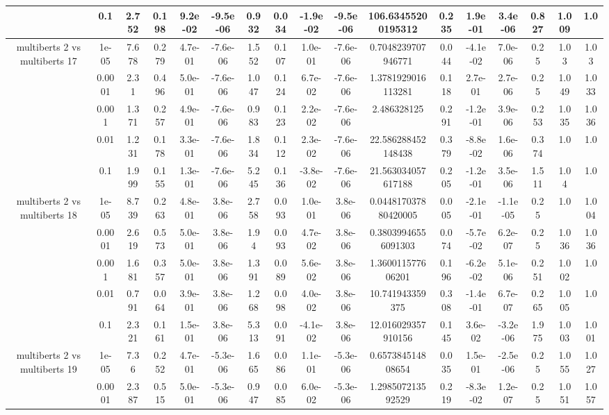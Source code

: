 \begin{tabular}{|c|c|c|c|c|c|c|c|c|c|c|c|c|c|c|c|c|}
 & 0.1 & 2.752 & 0.198 & 9.2e-02 & -9.5e-06 & 0.932 & 0.034 & -1.9e-02 & -9.5e-06 & 106.63455200195312 & 0.235 & 1.9e-01 & 3.4e-06 & 0.827 & 1.009 & 1.0 \\
\hline
\multirow{5}{*}{multiberts 2 vs multiberts 17} & 1e-05 & 7.678 & 0.279 & 4.7e-01 & -7.6e-06 & 1.552 & 0.107 & 1.0e-01 & -7.6e-06 & 0.7048239707946771 & 0.044 & -4.1e-02 & 7.0e-06 & 0.25 & 1.03 & 1.03 \\
 & 0.0001 & 2.31 & 0.496 & 5.0e-01 & -7.6e-06 & 1.047 & 0.124 & 6.7e-02 & -7.6e-06 & 1.3781929016113281 & 0.118 & 2.7e-01 & 2.7e-06 & 0.25 & 1.049 & 1.033 \\
 & 0.001 & 1.371 & 0.257 & 4.9e-01 & -7.6e-06 & 0.983 & 0.123 & 2.2e-02 & -7.6e-06 & 2.486328125 & 0.291 & -1.2e-01 & 3.9e-06 & 0.253 & 1.035 & 1.036 \\
 & 0.01 & 1.231 & 0.178 & 3.3e-01 & -7.6e-06 & 1.834 & 0.112 & 2.3e-02 & -7.6e-06 & 22.586288452148438 & 0.379 & -8.8e-02 & 1.6e-06 & 0.374 & 1.0 & 1.0 \\
 & 0.1 & 1.999 & 0.155 & 1.3e-01 & -7.6e-06 & 5.245 & 0.136 & -3.8e-02 & -7.6e-06 & 21.563034057617188 & 0.205 & -1.2e-01 & 3.5e-06 & 1.511 & 1.04 & 1.0 \\
\hline
\multirow{5}{*}{multiberts 2 vs multiberts 18} & 1e-05 & 8.739 & 0.263 & 4.8e-01 & 3.8e-06 & 2.758 & 0.093 & 1.0e-01 & 3.8e-06 & 0.044817037880420005 & 0.005 & -2.1e-01 & -1.1e-05 & 0.25 & 1.0 & 1.004 \\
 & 0.0001 & 2.619 & 0.573 & 5.0e-01 & 3.8e-06 & 1.94 & 0.093 & 4.7e-02 & 3.8e-06 & 0.38039946556091303 & 0.074 & -5.7e-02 & 6.2e-07 & 0.25 & 1.036 & 1.036 \\
 & 0.001 & 1.681 & 0.357 & 5.0e-01 & 3.8e-06 & 1.391 & 0.089 & 5.6e-02 & 3.8e-06 & 1.360011577606201 & 0.196 & -6.2e-02 & 5.1e-06 & 0.251 & 1.002 & 1.0 \\
 & 0.01 & 0.791 & 0.064 & 3.9e-01 & 3.8e-06 & 1.268 & 0.098 & 4.0e-02 & 3.8e-06 & 10.741943359375 & 0.308 & -1.4e-01 & 6.7e-07 & 0.265 & 1.005 & 1.0 \\
 & 0.1 & 2.321 & 0.161 & 1.5e-01 & 3.8e-06 & 5.313 & 0.091 & -4.1e-02 & 3.8e-06 & 12.016029357910156 & 0.145 & 3.6e-02 & -3.2e-06 & 1.975 & 1.003 & 1.001 \\
\hline
\multirow{5}{*}{multiberts 2 vs multiberts 19} & 1e-05 & 7.36 & 0.252 & 4.7e-01 & -5.3e-06 & 1.665 & 0.086 & 1.1e-01 & -5.3e-06 & 0.657384514808654 & 0.035 & 1.5e-01 & -2.5e-06 & 0.25 & 1.055 & 1.027 \\
 & 0.0001 & 2.387 & 0.515 & 5.0e-01 & -5.3e-06 & 0.947 & 0.085 & 6.0e-02 & -5.3e-06 & 1.298507213592529 & 0.219 & -8.3e-02 & 1.2e-07 & 0.25 & 1.051 & 1.057 \\

\end{tabular}
